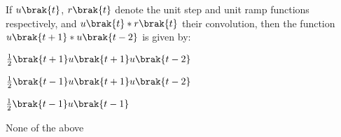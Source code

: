     \item If $u\brak{t}$, $r\brak{t}$ denote the unit step and unit ramp functions respectively, and $u\brak{t} * r\brak{t}$ their convolution, then the function $u\brak{t+1} * u\brak{t-2}$ is given by:
        \begin{enumerate}
                \begin{multicols}{2}
                \item $\frac{1}{2} \brak{t+1} u\brak{t+1} u\brak{t-2}$
                    \columnbreak
                \item $\frac{1}{2} \brak{t-1} u\brak{t+1} u\brak{t-2}$
                \end{multicols}
                \begin{multicols}{2}
                \item $\frac{1}{2} \brak{t-1} u\brak{t-1}$
                    \columnbreak
                \item None of the above
                \end{multicols}
        \end{enumerate}

